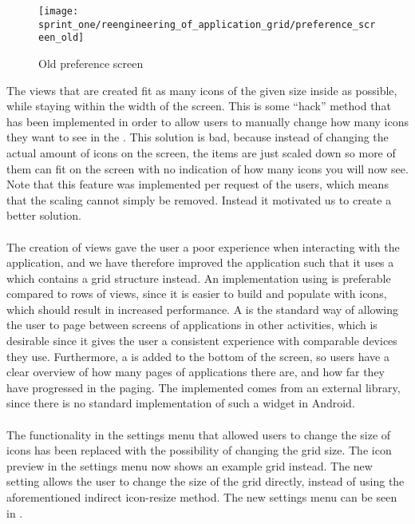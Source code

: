 \begin{figure}[!htbp]
    \centering
    \texttt{[image: sprint\_one/reengineering\_of\_application\_grid/preference\_screen\_old]}
    \caption{Old preference screen}
    \label{fig:preference_screen_old}
\end{figure}

The  views that are created fit as many icons of the given size inside as possible, while staying within the width of the screen. This is some ``hack'' method that has been implemented in order to allow users to manually change how many icons they want to see in the \launcher. This solution is bad, because instead of changing the actual amount of icons on the screen, the items are just scaled down so more of them can fit on the screen with no indication of how many icons you will now see. Note that this feature was implemented per request of the users, which means that the scaling cannot simply be removed. Instead it motivated us to create a better solution.
\\\\
The creation of  views gave the user a poor experience when interacting with the application, and we have therefore improved the \launcher application such that it uses a  which contains a grid structure instead. An implementation using  is preferable compared to rows of  views, since it is easier to build and populate with icons, which should result in increased performance. A  is the standard way of allowing the user to page between screens of applications in other \launcher activities, which is desirable since it gives the user a consistent experience with comparable devices they use. Furthermore, a  is added to the bottom of the screen, so users have a clear overview of how many pages of applications there are, and how far they have progressed in the paging. The implemented  comes from an external library\parencite{view_pager_indicator_avianey}, since there is no standard implementation of such a widget in Android.
\\\\
The functionality in the settings menu that allowed users to change the size of icons has been replaced with the possibility of changing the \launcher grid size. The icon preview in the settings menu now shows an example grid instead. The new setting allows the user to change the size of the grid directly, instead of using the aforementioned indirect icon-resize method. The new settings menu can be seen in .

